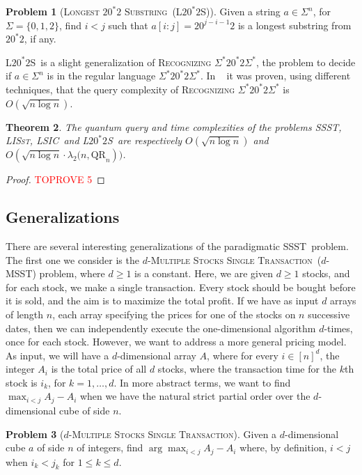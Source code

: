 \documentclass[12pt]{article}
\newcommand{\qr}{\mathrm{QR}}
\newcommand{\SSST}{\textsc{SSST}}
\newcommand{\LSIC}{\textsc{LSIC}}
\newcommand{\LISst}{\textsc{LISst}}
\newcommand{\Recognizing}{\textsc{Recognizing}}
\newcommand{\LZSf}{\textsc{Longest} $20^*2$ \textsc{Substring}}
\newcommand{\LZS}{\textsc{L}$20^*2$\textsc{S}}
\newcommand{\MSSTf}{\textsc{Multiple Stocks Single Transaction}}
\newcommand{\MSST}{\textsc{MSST}}
\newtheorem{theorem}{Theorem}
\theoremstyle{definition}
\newtheorem{problem}[theorem]{Problem}
\begin{document}
\begin{problem}[\LZSf \ (\LZS)]
Given a string $a \in \Sigma^n$, for $\Sigma = \{0,1,2\}$, find $i <j$ such that $a[i:j] = 20^{j-i-1}2$ is a longest substring from $20^*2$, if any.
\end{problem}

\LZS \ is a slight generalization of {\Recognizing} $\Sigma^{*}20^*2\Sigma^{*}$, the problem to decide if $a \in \Sigma^{n}$ is in the regular language $\Sigma^{*}20^*2\Sigma^{*}$.
In ~\cite{AGS19, CKKSW22} it was proven, using different techniques, that the query complexity of {\Recognizing} $\Sigma^{*}20^*2\Sigma^{*}$ is $O(\sqrt{n \log n})$.

\begin{theorem}
\label{thm:three}
The quantum query and time complexities of the problems \SSST, \LISst, \LSIC \ and \LZS \ are respectively $O(\sqrt{n \log n})$ and $O({\sqrt{n \log n} \cdot \lambda_2 (n, \qr_n}))$.
\end{theorem}

\begin{proof}\textcolor{red}{TOPROVE 5}\end{proof}

\subsection{Generalizations}
There are several interesting generalizations of the paradigmatic \SSST \ problem. The first one we consider is the $d$-\MSSTf \  ($d$-\MSST) problem, where $d \geq 1$ is a constant. Here, we are given $d \geq 1$ stocks, and for each stock, we make a single transaction. Every stock should be bought before it is sold, and the aim is to maximize the total profit. 
If we have as input $d$ arrays of length $n$, each array specifying the prices for one of the stocks on $n$ successive dates, then we can independently execute the one-dimensional algorithm $d$-times, once for each stock.
However, we want to address a more general pricing model.  
As input, we will have a $d$-dimensional array $A$, where for every $i \in [n]^d$, the integer $A_i$ is the total price of all $d$ stocks, where the transaction time for the $k$th stock is $i_k$, for $k = 1, \ldots, d$. 
In more abstract terms, we want to find $\max_{i < j} A_j - A_i$ when we have the natural strict partial order over the $d$-dimensional cube of side $n$.


\begin{problem}[$d$-\MSSTf]
Given a $d$-dimensional cube $a$ of side $n$ of integers,  find $\arg\max_{i < j} A_j - A_i$ where, by definition, $i<j$ when $i_k < j_k$ for $1 \leq k \leq d.$
\end{problem}
\end{document}
